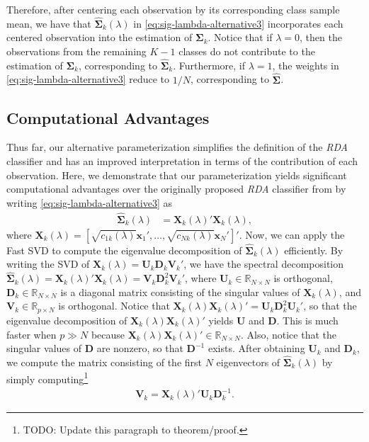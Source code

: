 \documentclass[11pt]{article}
\begin{document}
Therefore, after centering each observation by its corresponding class sample mean, we have that $\widehat{\bm\Sigma}_k(\lambda)$ in \eqref{eq:sig-lambda-alternative3} incorporates each centered observation into the estimation of $\bm \Sigma_k$. Notice that if $\lambda  = 0$, then the observations from the remaining $K - 1$ classes do not contribute to the estimation of $\bm \Sigma_k$, corresponding to $\widehat{\bm \Sigma}_k$. Furthermore, if $\lambda = 1$, the weights in \eqref{eq:sig-lambda-alternative3} reduce to $1/N$, corresponding to $\widehat{\bm\Sigma}$.

\subsection{Computational Advantages}

Thus far, our alternative parameterization simplifies the definition of the \emph{RDA} classifier and has an improved interpretation in terms of the contribution of each observation. Here, we demonstrate that our parameterization yields significant computational advantages over the originally proposed \emph{RDA} classifier from \cite{Friedman:1989tm} by writing \eqref{eq:sig-lambda-alternative3} as
\begin{align*}
	\widehat{\bm\Sigma}_k(\lambda) &= \bm X_k(\lambda)' \bm X_k(\lambda),
\end{align*}
where $\bm X_k(\lambda) = [\sqrt{c_{1k}(\lambda)} \bm x_1', \ldots,  \sqrt{c_{Nk}(\lambda)} \bm x_N']'$. Now, we can apply the Fast SVD to compute the eigenvalue decomposition of $\widehat{\bm\Sigma}_k(\lambda)$ efficiently. By writing the SVD of $\bm X_k(\lambda) = \bm U_k \bm D_k \bm V_k'$, we have the spectral decomposition $\widehat{\bm\Sigma}_k(\lambda) = \bm X_k(\lambda)' \bm X_k(\lambda) = \bm V_k \bm D_k^2 \bm V_k'$, where $\bm U_k \in \mathbb{R}_{N \times N}$ is orthogonal, $\bm D_k \in \mathbb{R}_{N \times N}$ is a diagonal matrix consisting of the singular values of $\bm X_k(\lambda)$, and $\bm V_k \in \mathbb{R}_{p \times N}$ is orthogonal. Notice that $\bm X_k(\lambda)\bm X_k(\lambda)' = \bm U_k \bm D_k^2 \bm U_k'$, so that the eigenvalue decomposition of $\bm X_k(\lambda)\bm X_k(\lambda)'$ yields $\bm U$ and $\bm D$. This is much faster when $p \gg N$ because $\bm X_k(\lambda)\bm X_k(\lambda)' \in \mathbb{R}_{N \times N}$. Also, notice that the singular values of $\bm D$ are nonzero, so that $\bm D^{-1}$ exists. After obtaining $\bm U_k$ and $\bm D_k$, we compute the matrix consisting of the first $N$ eigenvectors of $\widehat{\bm\Sigma}_k(\lambda)$ by simply computing\footnote{TODO: Update this paragraph to theorem/proof.}
\begin{align*}
	\bm V_k = \bm X_k(\lambda)' \bm U_k \bm D_k^{-1}.
\end{align*}
\end{document}
